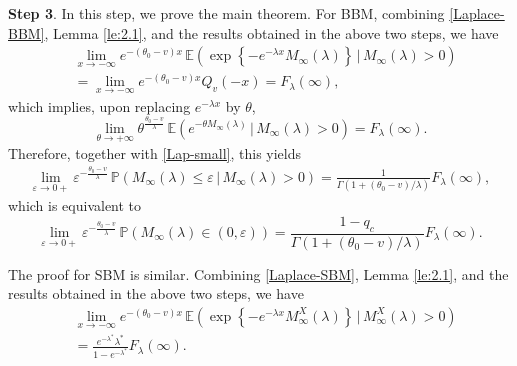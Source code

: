 \documentclass[10pt,a4paper]{amsart}
\numberwithin{equation}{section}
\begin{document}
{\bf Step 3}. In this step, we prove the main theorem. For BBM, combining \eqref{Laplace-BBM}, Lemma \ref{le:2.1}, and the results obtained in the above two steps, we have
\begin{align*}
	&\lim_{x \to -\infty} e^{-(\theta_0 - v)x} \, \mathbb{E}\left( \exp\left\{ -e^{-\lambda x} M_\infty(\lambda) \right\} \,\Big|\, M_\infty(\lambda) > 0 \right) \\
	&= 
	\lim_{x \to -\infty} e^{-(\theta_0 - v)x} Q_v(-x)=F_\lambda(\infty),
\end{align*}
which implies, upon replacing $e^{-\lambda x}$ by $\theta$,
\[
\lim_{\theta \to +\infty} \theta^{\frac{\theta_0 - v}{\lambda}} \, \mathbb{E}\left( e^{-\theta M_\infty(\lambda)} \,\Big|\, M_\infty(\lambda) > 0 \right)
=
F_\lambda(\infty).
\]
Therefore, together with \eqref{Lap-small}, this yields
\begin{align*}
	\lim_{\varepsilon \to 0+} \varepsilon^{-\frac{\theta_0 - v}{\lambda}} \, \mathbb{P}\left( M_\infty(\lambda) \leq \varepsilon \,\big|\, M_\infty(\lambda) > 0 \right)
	= 
	\frac{1}{\Gamma(1 + (\theta_0-v)/\lambda)}
	F_\lambda(\infty),
\end{align*}
which is equivalent to
\[
\lim_{\varepsilon \to 0+} \varepsilon^{-\frac{\theta_0 - v}{\lambda}} \, \mathbb{P}\left( M_\infty(\lambda) \in (0, \varepsilon) \right)
= 
\frac{1-q_c}{\Gamma(1 + (\theta_0-v)/\lambda)} 
F_\lambda(\infty).
\]

The proof for SBM is similar. Combining \eqref{Laplace-SBM}, Lemma \ref{le:2.1}, and the results obtained in the above two steps, we have
\begin{align*}
	&\lim_{x \to -\infty} e^{-(\theta_0 - v)x} \, \mathbb{E}\left( \exp\left\{ -e^{-\lambda x} M_\infty^X(\lambda) \right\} \,\Big|\, M_\infty^X(\lambda) > 0 \right) \\
	&= \frac{e^{-\lambda^*} \lambda^*}{1 - e^{-\lambda^*}} F_\lambda(\infty).
\end{align*}
\end{document}
